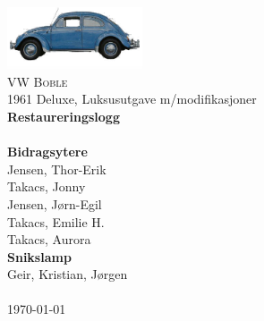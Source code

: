 \documentclass[12pt,a4paper] {report}
\begin{document}
\begin{titlepage}
	\begin{center}

		\includegraphics[width=0.3\textwidth]{img/vw_beetle_logo2.jpg}~\\[1cm]

		\textsc{\LARGE VW Boble}\\[.1cm]
		\textsc{\Large }1961 Deluxe, Luksusutgave m/modifikasjoner\\[3.5cm]

		{ \huge \bfseries Restaureringslogg}\\[0.5cm]
		\HRule \\[0.4cm]
		{\large \textbf{Bidragsytere}}\\
		{\large Jensen, Thor-Erik}\\
		{\large Takacs, Jonny}\\
		{\large Jensen, J\o rn-Egil}\\
		{\large Takacs, Emilie H.}\\
		{\large Takacs, Aurora}\\[0.6cm]
		{\large \textbf{Snikslamp}}\\
		{\large Geir, Kristian, Jørgen}\\[0.2cm]
		\HRule \\[1.5cm]

		\vfill
		{\large \today}

	\end{center}
\end{titlepage}

\tableofcontents %



\end{document}
